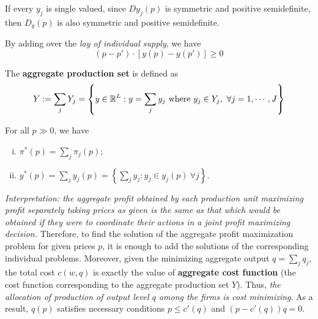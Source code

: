 \documentclass{article}
\begin{document}
	 		\begin{proposition}
	 			If every $y_j$ is single valued, since $Dy_j(p)$ is symmetric and positive semidefinite, then $D_y(p)$ is also symmetric and positive semidefinite.
	 		\end{proposition}
	 		
	 		\begin{proposition}
	 			By adding over the \emph{lay of individual supply}, we have 
	 			\begin{equation}
	 				(p-p') \cdot \left[y(p)-y(p')\right] \geq 0
	 			\end{equation}
	 		\end{proposition}
	 		
	 		\begin{definition}
	 			The \textbf{aggregate production set} is defined as
	 			\begin{equation}
	 				Y := \sum_j Y_j = \left\{y \in \mathbb{R}^L: y = \sum_j y_j \text{{ where }} y_j \in Y_j,\ \forall  j = 1, \cdots, J \right\}
	 			\end{equation}
	 		\end{definition}
	 		
	 		\begin{proposition}[5.E.1]
	 			For all $p \gg 0$, we have 
	 			\begin{enumerate}[(i)]
	 				\item $\pi^*(p) = \sum_j \pi_j (p)$;
	 				\item $y^*(p) = \sum_j y_j (p) = \left\{\sum_j y_j: y_j \in y_j(p)\ \forall j \right\}$.
	 			\end{enumerate}
	 			\emph{Interpretation: the aggregate profit obtained by each production unit maximizing profit separately taking prices as given is the same as that which would be obtained if they were to coordinate their actions in a joint profit maximizing decision.} Therefore, to find the solution of the aggregate profit maximization problem for given prices $p$, it is enough to add the solutions of the corresponding individual problems. Moreover, given the minimizing aggregate output $q = \sum_j q_j$, the total cost $c(w, q)$ is exactly the value of \textbf{aggregate cost function} (the cost function corresponding to the aggregate production set $Y$). Thus, \emph{the allocation of production of output level $q$ among the firms is cost minimizing}. As a result, $q(p)$ satisfies necessary conditions $p \leq c'(q)$ and $(p - c'(q))q = 0$.
	 		\end{proposition}
	 	
\end{document}
